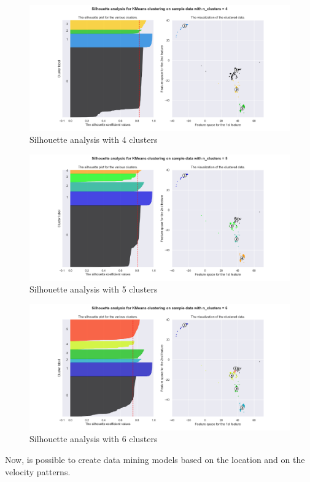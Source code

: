 \begin{figure}
\centering
\includegraphics[width=0.8\linewidth]{Chapters/img/silhouette_all_4.png}
\caption{Silhouette analysis with 4 clusters}
\label{fig:silhouette_all_4}
\end{figure}


\begin{figure}
\centering
\includegraphics[width=0.8\linewidth]{Chapters/img/silhouette_all_5.png}
\caption{Silhouette analysis with 5 clusters}
\label{fig:silhouette_all_5}
\end{figure}


\begin{figure}
\centering
\includegraphics[width=0.8\linewidth]{Chapters/img/silhouette_all_6.png}
\caption{Silhouette analysis with 6 clusters}
\label{fig:silhouette_all_6}
\end{figure}


Now, is possible to create data mining models based on the location and on the velocity patterns. 


